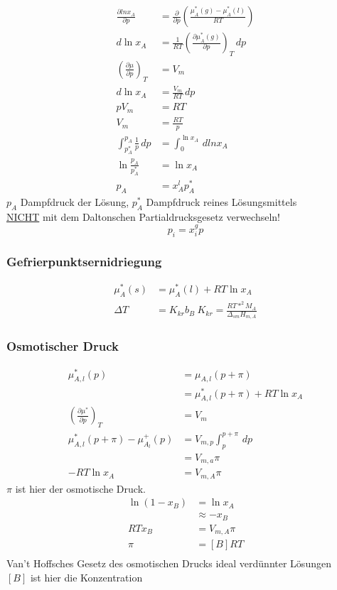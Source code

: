 \documentclass[a4paper, fleqn]{article}
\begin{document}
\begin{align*}
    \frac{\partial ln x_A}{\partial p} &= \frac{\partial}{\partial p} \left(\frac{\mu_A^*(g)-\mu_A^*(l)}{RT}\right)\\
    d\ln x_A &= \frac{1}{RT} \left(\frac{\partial \mu_A^*(g)}{\partial p}\right)_T \, dp\\
    \left(\frac{\partial  \mu}{\partial p}\right)_T &= V_m\\
    d\ln x_A &= \frac{V_m}{RT}\,dp\\
    pV_m &= RT\\
    V_m &= \frac{RT}{p}\\
    \int_{p_A^*}^{p_A}\frac{1}{p}\,dp &= \int_{0}^{\ln x_A} \,dln x_A\\
    \ln \frac{p_A}{p_A^*} &= \ln x_A\\
    p_A &= x_A^l p_A^*
\end{align*}
$p_A$ Dampfdruck der Lösung, $p_A^*$ Dampfdruck reines Lösungsmittels\\
\underline{NICHT} mit dem Daltonschen Partialdrucksgesetz verwechseln!\\
\begin{equation*}
    p_i = x_i^g p 
\end{equation*}

\subsubsection{Gefrierpunktsernidriegung}
\begin{align*}
    \mu_A^* (s) &= \mu_A^*(l) + RT \ln x_A\\
    \Delta T &= K_{kr} b_B\
    K_{kr} = \frac{RT*^2 M_A}{\Delta_{sm} H_{m,A}}
\end{align*}

\subsubsection{Osmotischer Druck}
\begin{align*}
    \mu_{A,l}^* (p) &= \mu_{A,l}(p+\pi)\\
    &= \mu_{A,l}^* (p+\pi) + RT\ln x_A\\
    \left(\frac{\partial \mu^*}{\partial p}\right)_T &= V_m\\
    \mu_{A,l}^* (p+\pi) - \mu_{A_l}^+ (p) &= V_{m,p} \int_{p}^{p+\pi}\,dp\\
    &= V_{m,a}\pi\\
    -RT\ln x_A &= V_{m,A} \pi
\end{align*}
$\pi$ ist hier der osmotische Druck.
\begin{align*}
    \ln \left(1-x_B\right) &= \ln x_A\\
    &\approx -x_B\\
    RT x_B &= V_{m,A} \pi\\
    \pi &= [B] RT\\
\end{align*}
Van't Hoffsches Gesetz des osmotischen Drucks ideal verdünnter Lösungen\\
$[B]$ ist hier die Konzentration
\end{document}

